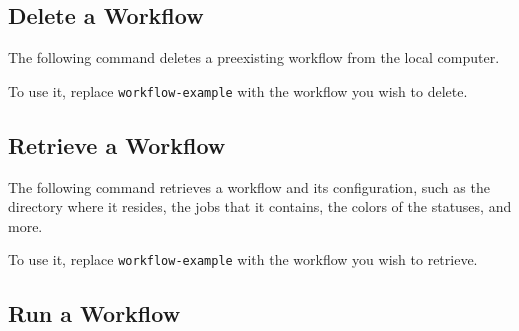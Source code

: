 \subsection{Delete a Workflow}\label{delete-a-workflow}

The following command deletes a preexisting workflow from the local
computer.

To use it, replace \texttt{workflow-example} with the workflow you wish
to delete.

\begin{Shaded}
\begin{Highlighting}[]
   \DataTypeTok{\textbackslash{}}
     \DataTypeTok{\textbackslash{}}
     
\end{Highlighting}
\end{Shaded}

\subsection{Retrieve a Workflow}\label{retrieve-a-workflow}

The following command retrieves a workflow and its configuration, such
as the directory where it resides, the jobs that it contains, the colors
of the statuses, and more.

To use it, replace \texttt{workflow-example} with the workflow you wish
to retrieve.

\begin{Shaded}
\begin{Highlighting}[]
   \DataTypeTok{\textbackslash{}}
     \DataTypeTok{\textbackslash{}}
     
\end{Highlighting}
\end{Shaded}

\subsection{Run a Workflow}\label{run-a-workflow}

